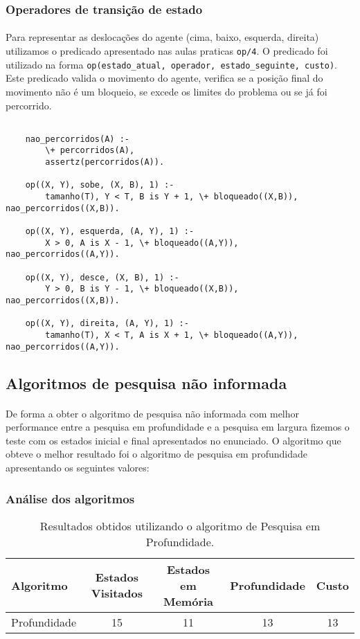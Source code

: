 \documentclass{article}
\begin{document}
\subsubsection{Operadores de transição de estado}

\paragraph{} Para representar as deslocações do agente (cima, baixo, esquerda, direita) utilizamos o predicado apresentado nas aulas praticas \texttt{op/4}. O predicado foi utilizado na forma \texttt{op(estado\_atual, operador, estado\_seguinte, custo)}. Este predicado valida o movimento do agente, verifica se a posição final do movimento não é um bloqueio, se excede os limites do problema ou se já foi percorrido.
\begin{verbatim}

    nao_percorridos(A) :- 
        \+ percorridos(A),
        assertz(percorridos(A)).
    
    op((X, Y), sobe, (X, B), 1) :-
        tamanho(T), Y < T, B is Y + 1, \+ bloqueado((X,B)), nao_percorridos((X,B)).
    
    op((X, Y), esquerda, (A, Y), 1) :-
        X > 0, A is X - 1, \+ bloqueado((A,Y)), nao_percorridos((A,Y)).
    
    op((X, Y), desce, (X, B), 1) :-
        Y > 0, B is Y - 1, \+ bloqueado((X,B)), nao_percorridos((X,B)).
    
    op((X, Y), direita, (A, Y), 1) :-
        tamanho(T), X < T, A is X + 1, \+ bloqueado((A,Y)), nao_percorridos((A,Y)).
\end{verbatim}

\newpage
\subsection{Algoritmos de pesquisa não informada}
\paragraph{} De forma a obter o algoritmo de pesquisa não informada com melhor performance entre a pesquisa em profundidade e a pesquisa em largura fizemos o teste com os estados inicial e final apresentados no enunciado. O algoritmo que obteve o melhor resultado foi o algoritmo de pesquisa em profundidade apresentando os seguintes valores:

\subsubsection{Análise dos algoritmos}
\begin{table}[h]
\centering
\begin{tabular}{l|c|c|c|c}
Algoritmo & Estados Visitados & Estados em Memória & Profundidade & Custo \\\hline
Profundidade & 15 & 11 & 13 & 13 

\end{tabular}
\caption{\label{tab:pni} Resultados obtidos utilizando o algoritmo de Pesquisa em Profundidade.}
\end{table}
\end{document}

